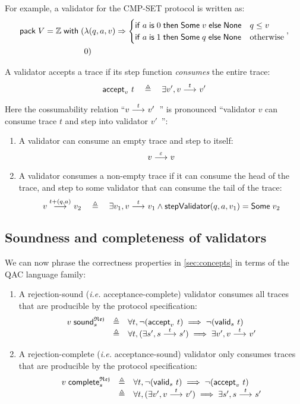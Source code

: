 For example, a validator for the CMP-SET protocol is written as:
\begin{align*}
  \mathsf{pack}\;V=\mathbb Z\;\mathsf{with}\;(&\lambda(q,a,v)\Rightarrow
      \begin{cases}
        \mathsf{if}\; a\;\mathsf{is}\; 0\;\mathsf{then}\;\mathsf{Some}\;v\;\mathsf{else}\;\mathsf{None}&q\le v\\
        \mathsf{if}\; a\;\mathsf{is}\; 1\;\mathsf{then}\;\mathsf{Some}\;q\;\mathsf{else}\;\mathsf{None}&\mathrm{otherwise}
      \end{cases}
   ,\\
    &0)
\end{align*}

\begin{definition}
A validator accepts a trace if its step function {\em consumes} the entire
trace:
\[\mathsf{accept}_{v}~{t}\quad\triangleq\quad\exists v',v\overset{t}\longrightarrow_{} v'\]

Here the cossumability relation ``$v\overset{t}\longrightarrow_{} v'$~'' is pronounced ``validator
$v$ can consume trace $t$ and step into validator $v'$~'':
\begin{enumerate}
\item A validator can consume an empty trace and step to itself:
  \[v\overset{\varepsilon}\longrightarrow_{} v\]
\item A validator consumes a non-empty trace if it can consume the head of the
  trace, and step to some validator that can consume the tail of the trace:
  \[v\overset{t+(q,a)}\longrightarrow_{} v_2\quad\triangleq\quad\exists v_1,v\overset{t}\longrightarrow_{} v_1\wedge
  \mathsf{stepValidator} (q,a,v_1)=\mathsf{Some}\;v_2\]
\end{enumerate}
\end{definition}

\subsection{Soundness and completeness of validators}
We can now phrase the correctness properties in \autoref{sec:concepts} in terms
of the QAC language family:
\begin{enumerate}
  \item A rejection-sound ({\it i.e.} acceptance-complete) validator consumes
    all traces that are producible by the protocol specification:
    \[\begin{array}{lrl}
      v\;\mathsf{sound}_{s}^\mathfrak{Rej}&\triangleq&\forall t,\neg(\mathsf{accept}_{v}~{t})\implies\neg(\mathsf{valid}_{s}~{t})\\
      &\triangleq&\forall t,(\exists s',s\overset{t}\longrightarrow_{} s')\implies\exists v',v\overset{t}\longrightarrow_{} v'
    \end{array}\]
  \item A rejection-complete ({\it i.e.} acceptance-sound) validator only
    consumes traces that are producible by the protocol specification:
    \[\begin{array}{lrl}
      v\;\mathsf{complete}_{s}^\mathfrak{Rej}&\triangleq&\forall t,\neg(\mathsf{valid}_{s}~{t})\implies\neg(\mathsf{accept}_{v}~{t})\\
      &\triangleq&\forall t,(\exists v',v\overset{t}\longrightarrow_{} v')\implies\exists s',s\overset{t}\longrightarrow_{} s'
    \end{array}\]
\end{enumerate}
